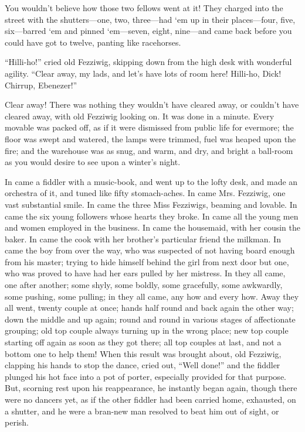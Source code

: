 \documentclass[paper=5.5in:8.5in,BCOR=15mm,twoside,DIV=15,headinclude=off,12pt,chapterprefix=off,openany,headings=huge]{scrbook} %
\begin{document}
You wouldn't believe how those two fellows went at it! They charged into the street with the shutters—one, two, three—had `em up in their places—four, five, six—barred `em and pinned `em—seven, eight, nine—and came back before you could have got to twelve, panting like racehorses.

\enquote{Hilli-ho!} cried old Fezziwig, skipping down from the high desk with wonderful agility. \enquote{Clear away, my lads, and let's have lots of room here! Hilli-ho, Dick! Chirrup, Ebenezer!}

Clear away! There was nothing they wouldn't have cleared away, or couldn't have cleared away, with old Fezziwig looking on. It was done in a minute. Every movable was packed off, as if it were dismissed from public life for evermore; the floor was swept and watered, the lamps were trimmed, fuel was heaped upon the fire; and the warehouse was as snug, and warm, and dry, and bright a ball-room as you would desire to see upon a winter's night.

In came a fiddler with a music-book, and went up to the lofty desk, and made an orchestra of it, and tuned like fifty stomach-aches. In came Mrs. Fezziwig, one vast substantial smile. In came the three Miss Fezziwigs, beaming and lovable. In came the six young followers whose hearts they broke. In came all the young men and women employed in the business. In came the housemaid, with her cousin the baker. In came the cook with her brother's particular friend the milkman. In came the boy from over the way, who was suspected of not having board enough from his master; trying to hide himself behind the girl from next door but one, who was proved to have had her ears pulled by her mistress. In they all came, one after another; some shyly, some boldly, some gracefully, some awkwardly, some pushing, some pulling; in they all came, any how and every how. Away they all went, twenty couple at once; hands half round and back again the other way; down the middle and up again; round and round in various stages of affectionate grouping; old top couple always turning up in the wrong place; new top couple starting off again as soon as they got there; all top couples at last, and not a bottom one to help them! When this result was brought about, old Fezziwig, clapping his hands to stop the dance, cried out, \enquote{Well done!} and the fiddler plunged his hot face into a pot of porter, especially provided for that purpose. But, scorning rest upon his reappearance, he instantly began again, though there were no dancers yet, as if the other fiddler had been carried home, exhausted, on a shutter, and he were a bran-new man resolved to beat him out of sight, or perish.
\end{document}
